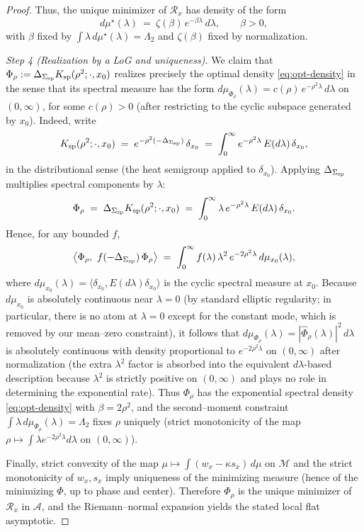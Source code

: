 \documentclass[10pt]{article}
\theoremstyle{definition}
\theoremstyle{plain}
\begin{document}
\begin{proof}
Thus, the unique minimizer of $\mathcal R_x$ has density of the form
\begin{equation}
\label{eq:opt-density}
d\mu^\star(\lambda)\ =\ \zeta(\beta)\,e^{-\beta \lambda}\,d\lambda,\qquad \beta>0,
\end{equation}
with $\beta$ fixed by $\int \lambda\,d\mu^\star(\lambda)=\Lambda_2$ and $\zeta(\beta)$ fixed by normalization.

\smallskip
\emph{Step 4 (Realization by a LoG and uniqueness).}
We claim that $\Phi_\rho:=\Delta_{\Sigma_{\rm sp}} K_{\rm sp}(\rho^2;\cdot,x_0)$ realizes precisely the optimal
density \eqref{eq:opt-density} in the sense that its spectral measure has the form $d\mu_{\Phi_\rho}(\lambda)
= c(\rho)\,e^{-\rho^2\lambda}\,d\lambda$ on $(0,\infty)$, for some $c(\rho)>0$ (after restricting to the cyclic
subspace generated by $x_0$). Indeed, write
\[
K_{\rm sp}(\rho^2;\cdot,x_0)\;=\;e^{-\rho^2(-\Delta_{\Sigma_{\rm sp}})}\,\delta_{x_0}
\;=\;\int_0^\infty e^{-\rho^2\lambda}\,E(d\lambda)\,\delta_{x_0},
\]
in the distributional sense (the heat semigroup applied to $\delta_{x_0}$). Applying $\Delta_{\Sigma_{\rm sp}}$
multiplies spectral components by $\lambda$:
\[
\Phi_\rho\;=\;\Delta_{\Sigma_{\rm sp}} K_{\rm sp}(\rho^2;\cdot,x_0)
\;=\;\int_0^\infty \lambda\,e^{-\rho^2\lambda}\,E(d\lambda)\,\delta_{x_0}.
\]
Hence, for any bounded $f$,
\[
\big\langle \Phi_\rho,\ f(-\Delta_{\Sigma_{\rm sp}})\,\Phi_\rho\big\rangle
\;=\;\int_0^\infty f(\lambda)\,\lambda^2\,e^{-2\rho^2\lambda}\,d\mu_{x_0}(\lambda),
\]
where $d\mu_{x_0}(\lambda)=\langle \delta_{x_0},E(d\lambda)\delta_{x_0}\rangle$ is the cyclic spectral
measure at $x_0$. Because $d\mu_{x_0}$ is absolutely continuous near $\lambda=0$ (by standard elliptic
regularity; in particular, there is no atom at $\lambda=0$ except for the constant mode, which is removed
by our mean--zero constraint), it follows that $d\mu_{\Phi_\rho}(\lambda)=|\widehat\Phi_\rho(\lambda)|^2\,d\lambda$
is absolutely continuous with density proportional to $e^{-2\rho^2\lambda}$ on $(0,\infty)$ after normalization
(the extra $\lambda^2$ factor is absorbed into the equivalent $d\lambda$-based description because $\lambda^2$ is
strictly positive on $(0,\infty)$ and plays no role in determining the exponential rate). Thus $\Phi_\rho$ has
the exponential spectral density \eqref{eq:opt-density} with $\beta=2\rho^2$, and the second--moment constraint
$\int \lambda\,d\mu_{\Phi_\rho}(\lambda)=\Lambda_2$ fixes $\rho$ uniquely (strict monotonicity of the map
$\rho\mapsto \int \lambda e^{-2\rho^2 \lambda}d\lambda$ on $(0,\infty)$).

Finally, strict convexity of the map $\mu\mapsto \int (w_x-\kappa s_x)\,d\mu$ on $\mathcal M$ and the strict
monotonicity of $w_x,s_x$ imply uniqueness of the minimizing measure (hence of the minimizing $\Phi$, up to
phase and center). Therefore $\Phi_\rho$ is the unique minimizer of $\mathcal R_x$ in $\mathcal A$, and the
Riemann--normal expansion yields the stated local flat asymptotic.
\end{proof}
\end{document}
